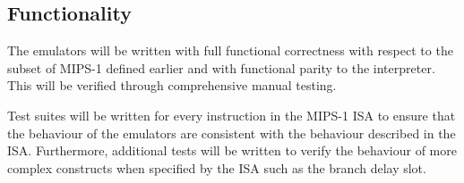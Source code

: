 \subsection{Functionality}
\label{section:req-caps-functionality}

The emulators will be written with full functional correctness with respect to the subset of MIPS-1 defined earlier and with functional parity to the interpreter. This will be verified through comprehensive manual testing.

Test suites will be written for every instruction in the MIPS-1 ISA to ensure that the behaviour of the emulators are consistent with the behaviour described in the ISA. Furthermore, additional tests will be written to verify the behaviour of more complex constructs when specified by the ISA such as the branch delay slot.